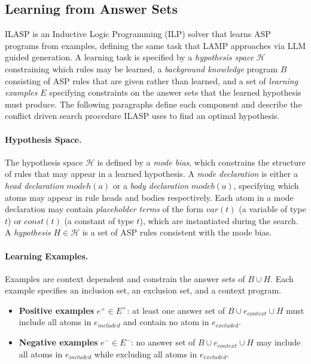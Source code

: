 \documentclass[11pt,a4paper]{article}
\begin{document}
\subsection{Learning from Answer Sets}\label{sec:ilasp}

ILASP \cite{law2020ilaspinductivelearninganswer} is an Inductive Logic Programming (ILP) solver that learns ASP programs from examples, defining the same task that LAMP approaches via LLM guided generation. A learning task is specified by a \textit{hypothesis space} $\mathcal{H}$ constraining which rules may be learned, a \textit{background knowledge} program $B$ consisting of ASP rules that are given rather than learned, and a set of \textit{learning examples} $E$ specifying constraints on the answer sets that the learned hypothesis must produce. The following paragraphs define each component and describe the conflict driven search procedure ILASP uses to find an optimal hypothesis.

\paragraph{Hypothesis Space.}
The hypothesis space $\mathcal{H}$ is defined by a \textit{mode bias}, which constrains the structure of rules that may appear in a learned hypothesis. A \textit{mode declaration} is either a \textit{head declaration} $\mathit{modeh}(a)$ or a \textit{body declaration} $\mathit{modeb}(a)$, specifying which atoms may appear in rule heads and bodies respectively. Each atom in a mode declaration may contain \textit{placeholder terms} of the form $\mathit{var}(t)$ (a variable of type $t$) or $\mathit{const}(t)$ (a constant of type $t$), which are instantiated during the search. A \textit{hypothesis} $H \in \mathcal{H}$ is a set of ASP rules consistent with the mode bias.

\paragraph{Learning Examples.}
Examples are context dependent and constrain the answer sets of $B \cup H$. Each example specifies an inclusion set, an exclusion set, and a context program.
\begin{itemize}
    \item \textbf{Positive examples} $e^+ \in E^+$: at least one answer set of $B \cup e_\mathit{context} \cup H$ must include all atoms in $e_\mathit{included}$ and contain no atom in $e_\mathit{excluded}$.
    \item \textbf{Negative examples} $e^- \in E^-$: no answer set of $B \cup e_\mathit{context} \cup H$ may include all atoms in $e_\mathit{included}$ while excluding all atoms in $e_\mathit{excluded}$.
\end{itemize}
\end{document}
